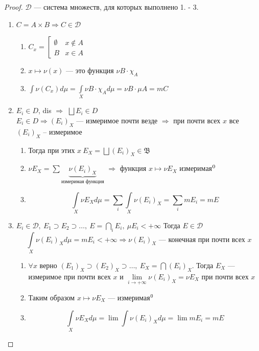 \documentclass[oneside]{book}
\newcommand{\B}{\mathfrak{B}}
\theoremstyle{plain}
\theoremstyle{remark}
\theoremstyle{definition}
\begin{document}
\begin{proof}
\(\mathcal{D}\) --- система множеств, для которых выполнено 1. - 3. 
\begin{enumerate}
\item \(C = A\times B \Rightarrow C \in \mathcal{D}\)
\begin{enumerate}
\item \(C_x = \left[\begin{matrix} \emptyset & x \not\in A \\ B & x \in A\end{matrix}\right.\)
\item \(x \mapsto \nu(x)\) --- это функция \(\nu B \cdot \chi_A\)
\item \(\int \nu(C_x) d\mu = \int\limits_X \nu B \cdot \chi_A d\mu = \nu B \cdot \mu A = mC\)
\end{enumerate}
\item \(E_i \in D\), dis \(\Rightarrow\) \(\bigsqcup E_i \in D\) \\
\(E_i \in D \Rightarrow (E_i)_X\) --- измеримое почти везде \(\Rightarrow\) при почти всех \(x\) все \((E_i)_X\) -- измеримое \\
\begin{enumerate}
\item Тогда при этих \(x\ E_X = \bigsqcup(E_i)_X \in \B\)
\item \(\nu E_X = \sum \underbrace{\nu(E_i)_X}_\text{измеримая функция}\) \(\Rightarrow\) функция \(x \mapsto \nu E_X\) измеримая\(\footnotemark[\value{footnote}]\)
\item \[ \int\limits_X \nu E_X d\mu = \sum_i \int\limits_X \nu(E_i)_X = \sum_i mE_i = mE \]
\end{enumerate}
\item \(E_i \in \mathcal{D},\ E_1 \supset E_2 \supset \dots,\ E = \bigcap\limits_iE_i,\ \mu E_i < + \infty\) Тогда \(E \in \mathcal{D}\)
\[ \int\limits_X \nu(E_i)_X d\mu = mE_i < +\infty \Rightarrow \nu(E_i)_X\text{ --- конечная при почти всех }x \]
\begin{enumerate}
\item \(\forall x\) верно \((E_1)_X \supset (E_2)_X \supset \dots ,\ E_X = \bigcap (E_i)_X\). Тогда \(E_X\) --- измеримое при почти всех \(x\) и \(\lim\limits_{i \to + \infty} \nu(E_i)_X = \nu E_X\) при почти всех \(x\)
\item Таким образом \(x \mapsto \nu E_X\) --- измеримая\(\footnotemark[\value{footnote}]\)
\item \[ \int\limits_X \nu E_X d\mu = \lim \int \nu(E_i)_X d\mu = \lim mE_i = mE \]

\end{enumerate}
\end{enumerate}
\end{proof}
\end{document}
